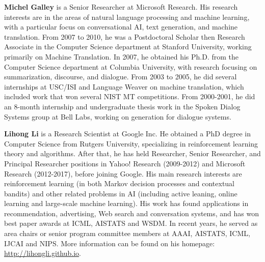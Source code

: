 {\bfseries Michel Galley} is a Senior Researcher at Microsoft
Research. His research interests are in
the areas of natural language processing and machine
learning, with a particular focus on conversational
AI, text generation, and machine translation.
From 2007 to 2010, he was a Postdoctoral
Scholar then Research Associate in the Computer
Science department at Stanford University, working
primarily on Machine Translation. In 2007,
he obtained his Ph.D. from the Computer Science
department at Columbia University, with research
focusing on summarization, discourse, and dialogue.
From 2003 to 2005, he did several internships
at USC/ISI and Language Weaver on machine
translation, which included work that won
several NIST MT competitions. From 2000-2001,
he did an 8-month internship and undergraduate
thesis work in the Spoken Dialog Systems group
at Bell Labs, working on generation for dialogue
systems.

{\bfseries Lihong Li} is a Research Scientist at Google
Inc. He obtained a PhD degree in Computer Science
from Rutgers University, specializing in reinforcement
learning theory and algorithms. After
that, he has held Researcher, Senior Researcher,
and Principal Researcher positions in Yahoo!
Research (2009-2012) and Microsoft Research
(2012-2017), before joining Google. His
main research interests are reinforcement learning
(in both Markov decision processes and contextual
bandits) and other related problems in AI (including
active leaning, online learning and large-scale
machine learning). His work has found applications
in recommendation, advertising, Web search
and conversation systems, and has won best paper
awards at ICML, AISTATS and WSDM. In recent
years, he served as area chairs or senior program
committee members at AAAI, AISTATS, ICML,
IJCAI and NIPS. More information can be found
on his homepage: \url{http://lihongli.github.io}.




